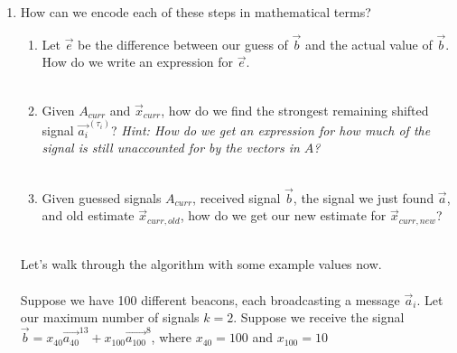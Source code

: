 \begin{enumerate}
    \item How can we encode each of these steps in mathematical terms?
    \begin{enumerate}
        \item Let $\vec{e}$ be the difference between our guess of $\vec{b}$ and the actual value of $\vec{b}$.
        How do we write an expression for $\vec{e}$.
        \\ \\
        \item Given $A_{curr}$ and $\vec{x}_{curr}$, how do we find the strongest remaining shifted signal $\vec{a_i}^{(\tau_i)}$?
        \textit{Hint: How do we get an expression for how much of the signal is still unaccounted for by the vectors in $A$?}
        \\ \\
        \item Given guessed signals $A_{curr}$, received signal $\vec{b}$, the signal we just found $\vec{a}$, and old estimate
        $\vec{x}_{curr, old}$, how do we get our new estimate for $\vec{x}_{curr, new}$?
        \\ \\
    \end{enumerate}
    Let's walk through the algorithm with some example values now.
    \\ \\
    Suppose we have 100 different beacons, each broadcasting a message $\vec{a}_i$.
    Let our maximum number of signals $k=2$.
    Suppose we receive the signal $\vec{b} = x_{40}\vec{a_{40}}^{13} + x_{100}\vec{a_{100}}^{8}$, where $x_{40} = 100$ and $x_{100} = 10$

\end{enumerate}
